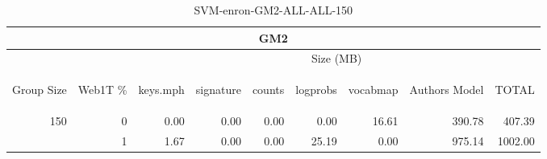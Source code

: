 \begin{center}
\begin{table}[htbp] 
 \begin{center}
\begin{tabular}{ | r | r | r | r | r | r | r | r | r |}
\hline
\multicolumn{9}{|c|}{GM2}\\
\hline
 & & \multicolumn{7}{|c|}{Size (MB)}\\ \cline{3-9}
\begin{sideways}Group Size\end{sideways} & \begin{sideways}Web1T \% \end{sideways} & \begin{sideways}keys.mph\end{sideways} & \begin{sideways}signature\end{sideways} & \begin{sideways}counts\end{sideways} & \begin{sideways}logprobs\end{sideways} & \begin{sideways}vocabmap\end{sideways} & \begin{sideways}Authors Model \end{sideways} & \begin{sideways}TOTAL\end{sideways}\\
\hline
\multirow{1}{*}{150}
 & 0 & 0.00 & 0.00 & 0.00 & 0.00 & 16.61 & 390.78 & 407.39\\ \cline{2-9}
 & 1 & 1.67 & 0.00 & 0.00 & 25.19 & 0.00 & 975.14 & 1002.00\\ \cline{2-9}
\hline
\end{tabular}
\caption{SVM-enron-GM2-ALL-ALL-150}
\label{table:SVM-enron-GM2-ALL-ALL-150}
\end{center}
 \end{table}
\end{center}

